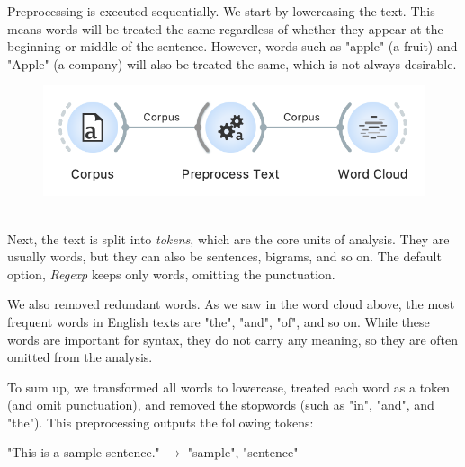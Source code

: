 Preprocessing is executed sequentially. We start by lowercasing the text. This means words will be treated the same regardless of whether they appear at the beginning or middle of the sentence. However, words such as "apple" (a fruit) and "Apple" (a company) will also be treated the same, which is not always desirable.

\begin{figure}
    \includegraphics[scale=0.7]{workflow.png}
    \caption{$\;$}
  \end{figure}

Next, the text is split into \emph{tokens}, which are the core units of analysis. They are usually words, but they can also be sentences, bigrams, and so on. The default option, \emph{Regexp} keeps only words, omitting the punctuation.

We also removed redundant words. As we saw in the word cloud above, the most frequent words in English texts are "the", "and", "of", and so on. While these words are important for syntax, they do not carry any meaning, so they are often omitted from the analysis.


To sum up, we transformed all words to lowercase, treated each word as a token (and omit punctuation), and removed the stopwords (such as "in", "and", and "the"). This preprocessing outputs the following tokens:

"This is a sample sentence." $\rightarrow$ "sample", "sentence"

